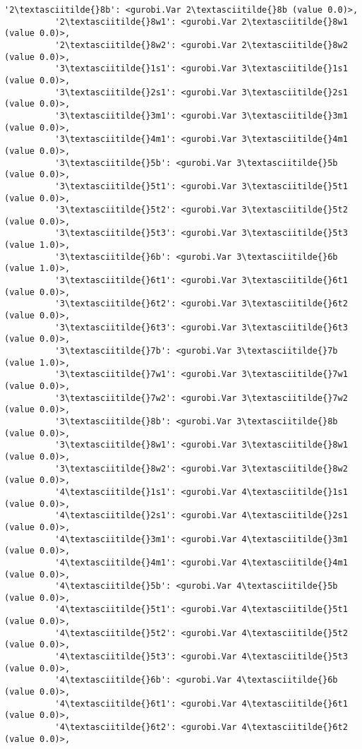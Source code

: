 \documentclass[11pt]{article}
\begin{document}
\begin{Verbatim}[commandchars=\\\{\}]
          '2\textasciitilde{}8b': <gurobi.Var 2\textasciitilde{}8b (value 0.0)>,
          '2\textasciitilde{}8w1': <gurobi.Var 2\textasciitilde{}8w1 (value 0.0)>,
          '2\textasciitilde{}8w2': <gurobi.Var 2\textasciitilde{}8w2 (value 0.0)>,
          '3\textasciitilde{}1s1': <gurobi.Var 3\textasciitilde{}1s1 (value 0.0)>,
          '3\textasciitilde{}2s1': <gurobi.Var 3\textasciitilde{}2s1 (value 0.0)>,
          '3\textasciitilde{}3m1': <gurobi.Var 3\textasciitilde{}3m1 (value 0.0)>,
          '3\textasciitilde{}4m1': <gurobi.Var 3\textasciitilde{}4m1 (value 0.0)>,
          '3\textasciitilde{}5b': <gurobi.Var 3\textasciitilde{}5b (value 0.0)>,
          '3\textasciitilde{}5t1': <gurobi.Var 3\textasciitilde{}5t1 (value 0.0)>,
          '3\textasciitilde{}5t2': <gurobi.Var 3\textasciitilde{}5t2 (value 0.0)>,
          '3\textasciitilde{}5t3': <gurobi.Var 3\textasciitilde{}5t3 (value 1.0)>,
          '3\textasciitilde{}6b': <gurobi.Var 3\textasciitilde{}6b (value 1.0)>,
          '3\textasciitilde{}6t1': <gurobi.Var 3\textasciitilde{}6t1 (value 0.0)>,
          '3\textasciitilde{}6t2': <gurobi.Var 3\textasciitilde{}6t2 (value 0.0)>,
          '3\textasciitilde{}6t3': <gurobi.Var 3\textasciitilde{}6t3 (value 0.0)>,
          '3\textasciitilde{}7b': <gurobi.Var 3\textasciitilde{}7b (value 1.0)>,
          '3\textasciitilde{}7w1': <gurobi.Var 3\textasciitilde{}7w1 (value 0.0)>,
          '3\textasciitilde{}7w2': <gurobi.Var 3\textasciitilde{}7w2 (value 0.0)>,
          '3\textasciitilde{}8b': <gurobi.Var 3\textasciitilde{}8b (value 0.0)>,
          '3\textasciitilde{}8w1': <gurobi.Var 3\textasciitilde{}8w1 (value 0.0)>,
          '3\textasciitilde{}8w2': <gurobi.Var 3\textasciitilde{}8w2 (value 0.0)>,
          '4\textasciitilde{}1s1': <gurobi.Var 4\textasciitilde{}1s1 (value 0.0)>,
          '4\textasciitilde{}2s1': <gurobi.Var 4\textasciitilde{}2s1 (value 0.0)>,
          '4\textasciitilde{}3m1': <gurobi.Var 4\textasciitilde{}3m1 (value 0.0)>,
          '4\textasciitilde{}4m1': <gurobi.Var 4\textasciitilde{}4m1 (value 0.0)>,
          '4\textasciitilde{}5b': <gurobi.Var 4\textasciitilde{}5b (value 0.0)>,
          '4\textasciitilde{}5t1': <gurobi.Var 4\textasciitilde{}5t1 (value 0.0)>,
          '4\textasciitilde{}5t2': <gurobi.Var 4\textasciitilde{}5t2 (value 0.0)>,
          '4\textasciitilde{}5t3': <gurobi.Var 4\textasciitilde{}5t3 (value 0.0)>,
          '4\textasciitilde{}6b': <gurobi.Var 4\textasciitilde{}6b (value 0.0)>,
          '4\textasciitilde{}6t1': <gurobi.Var 4\textasciitilde{}6t1 (value 0.0)>,
          '4\textasciitilde{}6t2': <gurobi.Var 4\textasciitilde{}6t2 (value 0.0)>,

\end{Verbatim}
\end{document}
